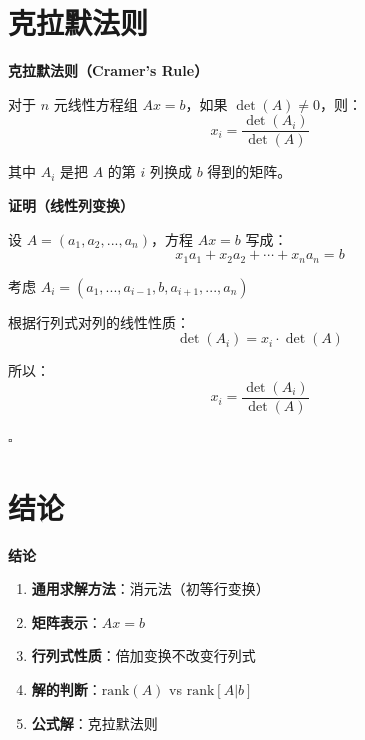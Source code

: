 \documentclass[aspectratio=169,12pt]{beamer}
\begin{document}
\section{克拉默法则}

\begin{frame}
\fontsize{10}{12}\selectfont
\centerline{\textbf{克拉默法则（Cramer's Rule）}}

\bigskip
对于 $n$ 元线性方程组 $Ax = b$，如果 $\det(A) \neq 0$，则：
\[
x_i = \frac{\det(A_i)}{\det(A)}
\]

其中 $A_i$ 是把 $A$ 的第 $i$ 列换成 $b$ 得到的矩阵。
\end{frame}

\begin{frame}
\fontsize{9}{11}\selectfont
\centerline{\textbf{证明（线性列变换）}}

设 $A = (a_1, a_2, ..., a_n)$，方程 $Ax = b$ 写成：
\[
x_1 a_1 + x_2 a_2 + \cdots + x_n a_n = b
\]

\pause
\bigskip
考虑 $A_i = (a_1, ..., a_{i-1}, b, a_{i+1}, ..., a_n)$

\pause
\bigskip
根据行列式对列的线性性质：
\[
\det(A_i) = x_i \cdot \det(A)
\]

\pause
\bigskip
所以：
\[
x_i = \frac{\det(A_i)}{\det(A)}
\]

\centerline{\hfill $\square$}
\end{frame}

\section{结论}

\begin{frame}
\centerline{\textbf{结论}}

\bigskip
\begin{enumerate}
    \item \textbf{通用求解方法}：消元法（初等行变换）
    \item \textbf{矩阵表示}：$Ax = b$
    \item \textbf{行列式性质}：倍加变换不改变行列式
    \item \textbf{解的判断}：$\text{rank}(A)$ vs $\text{rank}[A|b]$
    \item \textbf{公式解}：克拉默法则
\end{enumerate}
\end{frame}
\end{document}
